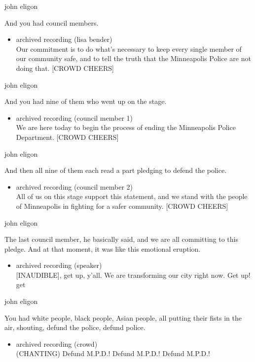 john eligon

And you had council members.

\begin{itemize}
\tightlist
\item
  archived recording (lisa bender)\\
  Our commitment is to do what's necessary to keep every single member
  of our community safe, and to tell the truth that the Minneapolis
  Police are not doing that. {[}CROWD CHEERS{]}
\end{itemize}

john eligon

And you had nine of them who went up on the stage.

\begin{itemize}
\tightlist
\item
  archived recording (council member 1)\\
  We are here today to begin the process of ending the Minneapolis
  Police Department. {[}CROWD CHEERS{]}
\end{itemize}

john eligon

And then all nine of them each read a part pledging to defend the
police.

\begin{itemize}
\tightlist
\item
  archived recording (council member 2)\\
  All of us on this stage support this statement, and we stand with the
  people of Minneapolis in fighting for a safer community. {[}CROWD
  CHEERS{]}
\end{itemize}

john eligon

The last council member, he basically said, and we are all committing to
this pledge. And at that moment, it was like this emotional eruption.

\begin{itemize}
\tightlist
\item
  archived recording (speaker)\\
  {[}INAUDIBLE{]}, get up, y'all. We are transforming our city right
  now. Get up! get
\end{itemize}

john eligon

You had white people, black people, Asian people, all putting their
fists in the air, shouting, defund the police, defund police.

\begin{itemize}
\tightlist
\item
  archived recording (crowd)\\
  (CHANTING) Defund M.P.D.! Defund M.P.D.! Defund M.P.D.!
\end{itemize}

